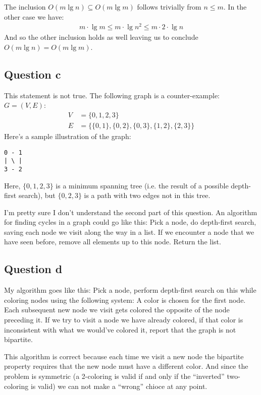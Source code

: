 The inclusion $O(m\lg n) \subseteq O(m\lg m)$ follows trivially from $n \leq m$. In the other case we have:
%
\begin{align*}
  m \cdot \lg m \leq m \cdot \lg n^2 \leq m \cdot 2 \cdot \lg n
\end{align*}
%
And so the other inclusion holds as well leaving us to conclude $O(m\lg n)
= O(m\lg m)$. \QED
%
\subsection*{Question c}
This statement is not true. The following graph is a counter-example:
$G=(V,E)$:
%
\begin{align*}
  V & = \{0,1,2,3\} \\
  E & = \{\{0,1\},\{0,2\},\{0,3\},\{1,2\},\{2,3\}\}
\end{align*}
%
Here's a sample illustration of the graph:
%
\begin{verbatim}
0 - 1
| \ |
3 - 2
\end{verbatim}
%
Here, $\{0,1,2,3\}$ is a minimum spanning tree (i.e. the result of a possible
depth-first search), but $\{0,2,3\}$ is a path with two edges not in this tree.

I'm pretty sure I don't understand the second part of this question. An
algorithm for finding cycles in a graph could go like this: Pick a node, do
depth-first search, saving each node we visit along the way in a list. If we
encounter a node that we have seen before, remove all elements up to this node.
Return the list.
%
\subsection*{Question d}
My algorithm goes like this: Pick a node, perform depth-first search on this
while coloring nodes using the following system: A color is chosen for the first
node. Each subsequent new node we visit gets colored the opposite of the node
preceding it. If we try to visit a node we have already colored, if that color
is inconsistent with what we would've colored it, report that the graph is not
bipartite.

This algorithm is correct because each time we visit a new node the bipartite
property requires that the new node must have a different color. And since the
problem is symmetric (a 2-coloring is valid if and only if the ``inverted''
two-coloring is valid) we can not make a ``wrong'' chioce at any point.
